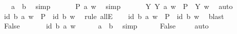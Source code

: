 \begin{isabellebody}
\ {}{\isacharcolon}\ {\isachardoublequoteopen}\ {\isasymnot}{\isacharparenleft}a\ {\isacharequal}\ b{\isacharparenright}{\isachardoublequoteclose}\ \isamarkupfalse%
\ simp\isanewline
\ \ \isamarkupfalse%
\ {}\ \isamarkupfalse%
\ {\isachardoublequoteopen}P\ a\ w{\isachardoublequoteclose}\ \isamarkupfalse%
\ simp\isanewline
\ \ \isamarkupfalse%
\ {}\ \isamarkupfalse%
\ {\isachardoublequoteopen}{\isasymforall}Y{\isachardot}\ Y\ a\ w\ {\isasymlongrightarrow}\ {\isacharparenleft}{\isacharparenleft}P\ {\isasymRrightarrow}\ Y{\isacharparenright}\ w{\isacharparenright}{\isachardoublequoteclose}\ \isamarkupfalse%
\ auto\isanewline
\ \ \isamarkupfalse%
\ {\isachardoublequoteopen}{\isacharparenleft}\isactrlbold {\isasymrightharpoondown}{\isacharparenleft}id\ b{\isacharparenright}{\isacharparenright}\ a\ w\ {\isasymlongrightarrow}\ {\isacharparenleft}P\ {\isasymRrightarrow}\ {\isacharparenleft}\isactrlbold {\isasymrightharpoondown}{\isacharparenleft}id\ b{\isacharparenright}{\isacharparenright}{\isacharparenright}\ w{\isachardoublequoteclose}\ \isamarkupfalse%
\ {\isacharparenleft}rule\ allE{\isacharparenright}\isanewline
\ \ \isamarkupfalse%
\ {\isachardoublequoteopen}{\isasymnot}{\isacharparenleft}\isactrlbold {\isasymrightharpoondown}{\isacharparenleft}id\ b{\isacharparenright}{\isacharparenright}\ a\ w\ {\isasymor}\ {\isacharparenleft}{\isacharparenleft}P\ {\isasymRrightarrow}\ {\isacharparenleft}\isactrlbold {\isasymrightharpoondown}{\isacharparenleft}id\ b{\isacharparenright}{\isacharparenright}{\isacharparenright}\ w{\isacharparenright}{\isachardoublequoteclose}\ \isamarkupfalse%
\ blast\ \isanewline
\ \ \isamarkupfalse%
\ \isamarkupfalse%
\ False\ \isamarkupfalse%
\isanewline
\ \ \ \ \isamarkupfalse%
\ {\isachardoublequoteopen}{\isasymnot}{\isacharparenleft}\isactrlbold {\isasymrightharpoondown}{\isacharparenleft}id\ b{\isacharparenright}{\isacharparenright}\ a\ w{\isachardoublequoteclose}\isanewline
\ \ \ \ \isamarkupfalse%
\ {\isachardoublequoteopen}a\ {\isacharequal}\ b{\isachardoublequoteclose}\ \isamarkupfalse%
\ simp\isanewline
\ \ \ \ \isamarkupfalse%
\ False\ \isamarkupfalse%
\ {}\ \isamarkupfalse%
\ auto\isanewline
\ \ \ \ \isamarkupfalse%
\ \ \isanewline
\ \ \ \ \isamarkupfalse%

\end{isabellebody}
